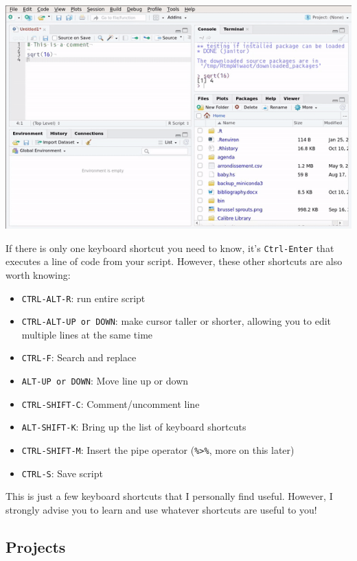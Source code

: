 \documentclass[]{gitbook}
\providecommand{\tightlist}{%
  \setlength{\itemsep}{0pt}\setlength{\parskip}{0pt}}
\theoremstyle{definition}
\theoremstyle{definition}
\theoremstyle{definition}
\theoremstyle{remark}
\begin{document}
\includegraphics{pics/rstudio_shortcuts.gif}

If there is only one keyboard shortcut you need to know, it's
\texttt{Ctrl-Enter} that executes a line of code from your script.
However, these other shortcuts are also worth knowing:

\begin{itemize}
\tightlist
\item
  \texttt{CTRL-ALT-R}: run entire script
\item
  \texttt{CTRL-ALT-UP\ or\ DOWN}: make cursor taller or shorter,
  allowing you to edit multiple lines at the same time
\item
  \texttt{CTRL-F}: Search and replace
\item
  \texttt{ALT-UP\ or\ DOWN}: Move line up or down
\item
  \texttt{CTRL-SHIFT-C}: Comment/uncomment line
\item
  \texttt{ALT-SHIFT-K}: Bring up the list of keyboard shortcuts
\item
  \texttt{CTRL-SHIFT-M}: Insert the pipe operator
  (\texttt{\%\textgreater{}\%}, more on this later)
\item
  \texttt{CTRL-S}: Save script
\end{itemize}

This is just a few keyboard shortcuts that I personally find useful.
However, I strongly advise you to learn and use whatever shortcuts are
useful to you!

\hypertarget{projects}{%
\subsection{Projects}\label{projects}}
\end{document}
